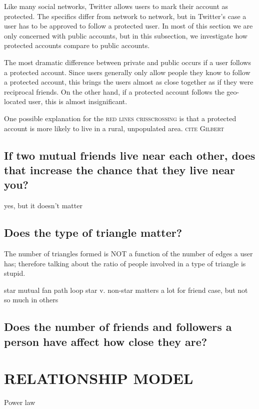 \documentclass{sig-alternate}
\begin{document}
Like many social networks, Twitter allows users to mark their account as protected. The specifics differ from network to network, but in Twitter's case a user has to be approved to follow a protected user.
In most of this section we are only concerned with public accounts, but in this subsection, we investigate how protected accounts compare to public accounts.

The most dramatic difference between private and public occurs if a user follows a protected account.
Since users generally only allow people they know to follow a protected account, this brings the users almost as close together as if they were reciprocal friends. On the other hand, if a protected account follows the geo-located user, this is almost insignificant.

One possible explanation for the \textsc{red lines crisscrossing} is that a protected account is more likely to live in a rural, unpopulated area. \textsc{cite Gilbert}

\subsection{If two mutual friends live near each other, does that increase the chance that they live near you?}
yes, but it doesn't matter

\subsection{Does the type of triangle matter?}

The number of triangles formed is NOT a function of the number of edges a user has; therefore talking about the ratio of people involved in a type of triangle is stupid.

star
mutual fan
path
loop 
star v. non-star matters a lot for friend case, but not so much in others



\subsection{Does the number of friends and followers a person have affect how close they are?}


\section{RELATIONSHIP MODEL}
\label{sec:model}

Power law
\end{document}
